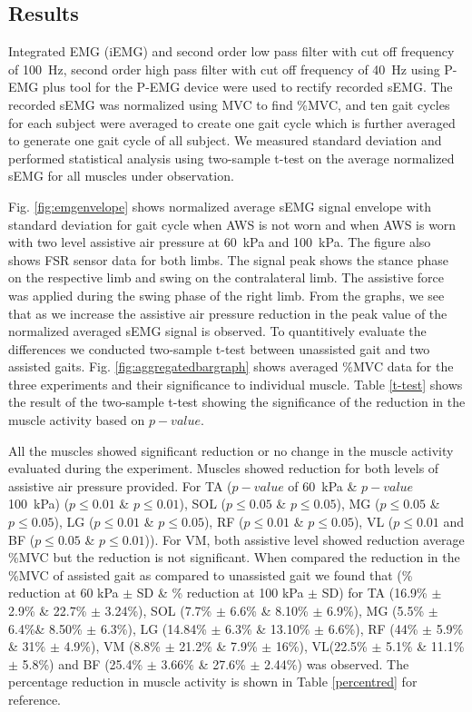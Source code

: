 \documentclass[letterpaper, 10 pt, conference]{ieeeconf}  %
\begin{document}
\subsection{Results}

Integrated EMG (iEMG) and second order low pass filter with cut off frequency of \SI{100}{\hertz}, second order high pass filter with cut off frequency of \SI{40}{\hertz} using P-EMG plus tool for the P-EMG device were used to rectify recorded sEMG. The recorded sEMG was normalized using MVC to find \%MVC, and ten gait cycles for each subject were averaged to create one gait cycle which is further averaged to generate one gait cycle of all subject. We measured standard deviation and performed statistical analysis using two-sample t-test on the average normalized sEMG for all muscles under observation.

Fig. \ref{fig:emgenvelope} shows normalized average sEMG signal envelope with standard deviation for gait cycle when AWS is not worn and when AWS is worn with two level assistive air pressure at \SI{60}{\kilo\pascal} and \SI{100}{\kilo\pascal}. The figure also shows FSR sensor data for both limbs. The signal peak shows the stance phase on the respective limb and swing on the contralateral limb. The assistive force was applied during the swing phase of the right limb. From the graphs, we see that as we increase the assistive air pressure reduction in the peak value of the normalized averaged sEMG signal is observed. To quantitively evaluate the differences we conducted two-sample t-test between unassisted gait and two assisted gaits. Fig. \ref{fig:aggregatedbargraph} shows averaged \%MVC data for the three experiments and their significance to individual muscle. Table \ref{t-test} shows the result of the two-sample t-test showing the significance of the reduction in the muscle activity based on $p-value$. 

All the muscles showed significant reduction or no change in the muscle activity evaluated during the experiment. Muscles showed reduction for both levels of assistive air pressure provided. For TA ($p-value$ of \SI{60}{\kilo\pascal} \& $p-value$  \SI{100}{\kilo\pascal}) ($p\le0.01$ \& $p\le0.01$), SOL ($p\le0.05$ \& $p\le0.05$), MG ($p\le0.05$ \& $p\le0.05$), LG ($p\le0.01$ \& $p\le0.05$), RF ($p\le0.01$ \& $p\le0.05$), VL ($p\le0.01$ and BF ($p\le0.05$ \& $p\le0.01$)). For VM, both assistive level showed reduction average \%MVC but the reduction is not significant. When compared the reduction in the \%MVC of assisted gait as compared to unassisted gait we found that (\% reduction at 60 kPa $\pm$ SD \& \% reduction at 100 kPa $\pm$ SD) for TA (16.9\% $\pm$ 2.9\% \& 22.7\% $\pm$ 3.24\%), SOL (7.7\% $\pm$ 6.6\% \& 8.10\% $\pm$ 6.9\%), MG (5.5\% $\pm$ 6.4\%\& 8.50\% $\pm$ 6.3\%), LG (14.84\% $\pm$ 6.3\% \& 13.10\% $\pm$ 6.6\%), RF (44\% $\pm$ 5.9\% \& 31\% $\pm$ 4.9\%), VM (8.8\% $\pm$ 21.2\% \& 7.9\% $\pm$ 16\%), VL(22.5\% $\pm$ 5.1\% \& 11.1\% $\pm$ 5.8\%) and BF (25.4\% $\pm$ 3.66\% \& 27.6\% $\pm$ 2.44\%) was observed. The percentage reduction in muscle activity is shown in Table \ref{percentred} for reference. 
\end{document}
